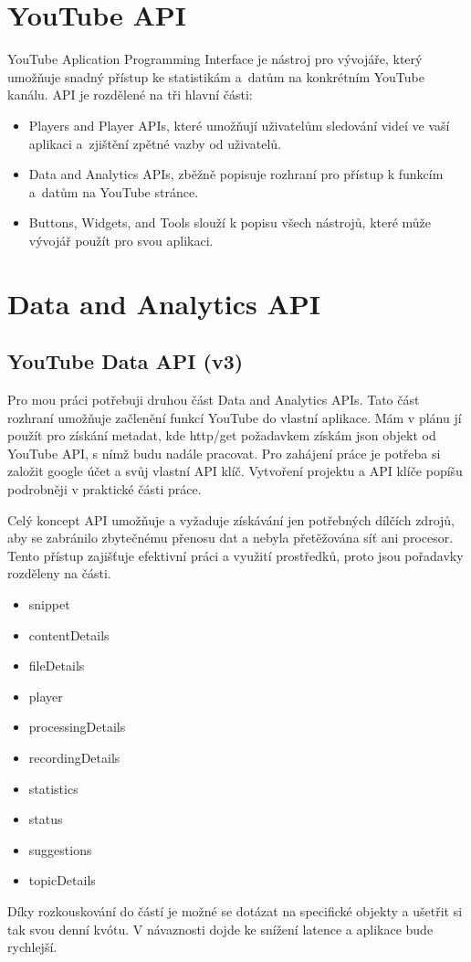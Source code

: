 \section{YouTube API}
\par YouTube Aplication Programming Interface je nástroj pro vývojáře, který umožňuje snadný přístup ke statistikám a~datům na konkrétním YouTube kanálu. API je rozdělené na tři hlavní části:
\begin{itemize}
	\item{Players and Player APIs, které umožňují uživatelům sledování videí ve vaší aplikaci a~zjištění zpětné vazby od uživatelů.}
	\item{Data and Analytics APIs, zběžně popisuje rozhraní pro přístup k funkcím a~datům na YouTube stránce.}
	\item{Buttons, Widgets, and Tools slouží k popisu všech nástrojů, které může vývojář použít pro svou aplikaci.}
\end{itemize}

\section{Data and Analytics API}
\subsection{YouTube Data API (v3)}
\par Pro mou práci potřebuji druhou část Data and Analytics APIs. Tato část rozhraní umožňuje začlenění funkcí YouTube do vlastní aplikace. Mám v plánu jí použít pro získání metadat, kde http/get požadavkem získám json objekt od YouTube API, s nímž budu nadále pracovat. Pro zahájení práce je potřeba si založit google účet a svůj vlastní API klíč. Vytvoření projektu a API klíče popíšu podrobněji v praktické části práce.
\par Celý koncept API umožňuje a vyžaduje získávání jen potřebných dílčích zdrojů, aby se zabránilo zbytečnému přenosu dat a nebyla přetěžována síť ani procesor. Tento přístup zajišťuje efektivní práci a využití prostředků, proto jsou pořadavky rozděleny na části. 
\begin{itemize} 
\item{snippet}
\item{contentDetails}
\item{fileDetails}
\item{player}
\item{processingDetails}
\item{recordingDetails}
\item{statistics}
\item{status}
\item{suggestions}
\item{topicDetails}
\end{itemize}
\par Díky rozkouskování do částí je možné se dotázat na specifické objekty a ušetřit si tak svou denní kvótu. V návaznosti dojde ke snížení latence a aplikace bude rychlejší. 

